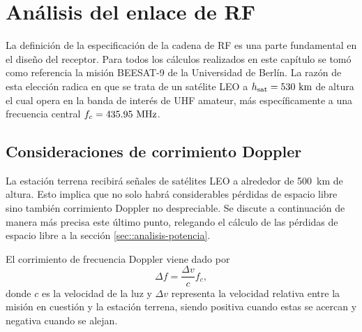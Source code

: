\documentclass[../../main.tex]{subfiles}
\begin{document}
\graphicspath{{./figures}}
\chapter{Análisis del enlace de RF}

La definición de la especificación de la cadena de RF es una parte fundamental en el diseño del receptor. 
Para todos los cálculos realizados en este capítulo se tomó como referencia la misión BEESAT-9 \cite{BEESAT-9} de la Universidad de Berlín. 
La razón de esta elección radica en que se trata de un satélite LEO a $h_\textrm{sat} = 530~\textrm{km}$ de altura el cual opera en la banda de interés de UHF amateur, más específicamente a una frecuencia central $f_c = 435.95~\textrm{MHz}$.

\section{Consideraciones de corrimiento Doppler}
La estación terrena recibirá señales de satélites LEO a alrededor de 500~km de altura. Esto implica que no solo habrá considerables pérdidas de espacio libre sino también corrimiento Doppler no despreciable. Se discute a continuación de manera más precisa este último punto, relegando el cálculo de las pérdidas de espacio libre a la sección \ref{sec::analisis-potencia}.

El corrimiento de frecuencia Doppler viene dado por
\begin{equation}
    \Delta f = \frac{\Delta v}{c} f_c,
\end{equation}
donde $c$ es la velocidad de la luz y $\Delta v$ representa la velocidad relativa entre la misión en cuestión y la estación terrena, siendo positiva cuando estas se acercan y negativa cuando se alejan.

\end{document}
